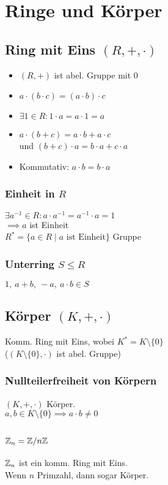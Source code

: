 \section*{Ringe und Körper}

\subsection*{Ring mit Eins $(R,+,\cdot)$}
\begin{itemize}
	\item $(R,+)$ ist abel. Gruppe mit $0$
	\item $a\cdot(b\cdot c) = (a\cdot b)\cdot c$
	\item $\exists 1\in R: 1\cdot a = a \cdot 1 = a$
	\item $a \cdot (b+c)=a\cdot b + a\cdot c$ \\
		und $(b+c)\cdot a = b\cdot a + c \cdot a$
	\item Kommutativ: $a\cdot b=b \cdot a$
\end{itemize}

\subsubsection*{Einheit in $R$}
$\exists a^{-1}\in R: a\cdot a^{-1}=a^{-1}\cdot a = 1$ \\
$\implies a$ ist Einheit \\
$R^* = \{a\in R \mid a \text{ ist Einheit}\}$ Gruppe

\subsubsection*{Unterring $S\le R$}
$1,~ a+b,~ -a,~ a\cdot b \in S$

\subsection*{Körper $(K,+,\cdot)$}
Komm. Ring mit Eins, wobei $K^* = K\setminus\{0\}$ \\
($(K\setminus\{0\},\cdot)$ ist abel. Gruppe)

\subsubsection*{Nullteilerfreiheit von Körpern}
$(K,+,\cdot)$ Körper. \\
$a,b\in K \setminus\{0\} \implies a\cdot b \neq 0$

\subsection*{$\mathbb{Z}_n=\mathbb{Z} / n\mathbb{Z}$}
$\mathbb{Z}_n$ ist ein komm. Ring mit Eins. \\
Wenn $n$ Primzahl, dann sogar Körper.

